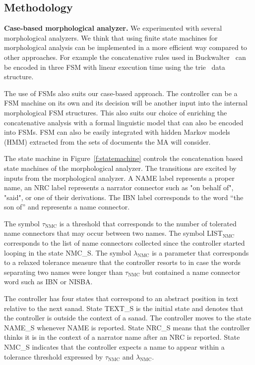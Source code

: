 \documentclass[12pt]{article}
\begin{document}
\subsection{Methodology}
\label{s:design:method}

\begin{figure}
\end{figure}

{\bf Case-based morphological analyzer.}
We experimented with several morphological analyzers.
We think that using finite state machines for morphological analysis
can be implemented in a more efficient way compared to other 
approaches. 
For example the concatenative rules used in Buckwalter~\cite{Tim04}
can be encoded in three FSM with linear execution time using 
the trie~\cite{Aoe:89} data structure. 

The use of FSMs also suits our case-based approach. 
The controller can be a FSM machine on its own and its decision
will be another input into the internal morphological FSM structures. 
This also suits our choice of enriching the concatenative analysis
with a formal linguistic model that can also be encoded into FSMs. 
FSM can also be easily integrated with hidden Markov models (HMM)
extracted from the sets of documents the MA will consider. 

The state machine in Figure~\ref{f:statemachine} controls 
the concatenation based state machines of the morphological
analyzer.
The transitions are excited
by inputs from the morphological analyzer. 
A NAME label represents a proper name, 
an NRC label represents a narrator connector such as
 "on behalf of",  "said", 
or one of their derivations. 
The IBN label corresponds to the word  
``the son of'' and represents a name connector.

The symbol $\tau_{\mbox{NMC}}$ is a threshold
that corresponds to the number of tolerated name connectors 
that may occur between two names. 
The symbol LIST$_{\mbox{NMC}}$ corresponds to the list 
of name connectors collected since the controller
started looping in the state NMC\_S. 
The symbol $\lambda_{\mbox{NMC}}$ is a parameter 
that corresponds to a relaxed tolerance measure that
the controller resorts to in case the words separating
two names were longer than $\tau_{\mbox{NMC}}$ but 
contained a name connector word such as IBN or NISBA.

The controller has four states that correspond to 
an abstract position in text relative to the next sanad. 
State TEXT\_S is the initial state and denotes that
the controller is outside the context of a sanad.
The controller moves to the state NAME\_S whenever
NAME is reported.
State NRC\_S means that the controller thinks it is in the context
of a narrator name after an NRC is reported.
State NMC\_S
indicates that the controller expects a name to appear within 
a tolerance threshold expressed by 
$\tau_{\mbox{NMC}}$ and $\lambda_{\mbox{NMC}}$.
\end{document}
